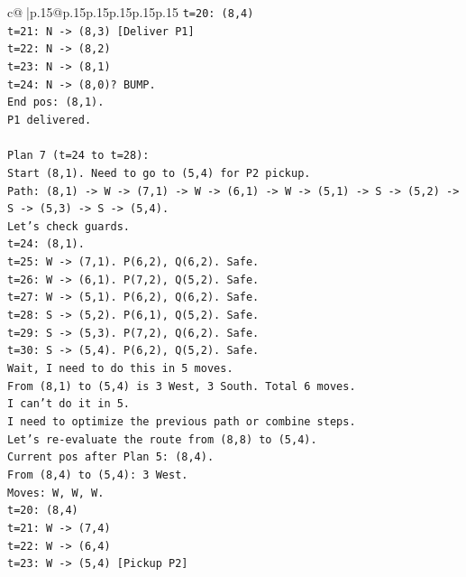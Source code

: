 \documentclass{article}
\begin{document}
{\begin{supertabular}{c@{$\;$}|p{.15\linewidth}@{}p{.15\linewidth}p{.15\linewidth}p{.15\linewidth}p{.15\linewidth}p{.15\linewidth}}
{{{\texttt{t=20: (8,4)} \\
\texttt{t=21: N {-}> (8,3) {[}Deliver P1{]}} \\
\texttt{t=22: N {-}> (8,2)} \\
\texttt{t=23: N {-}> (8,1)} \\
\texttt{t=24: N {-}> (8,0)? BUMP.} \\
\texttt{End pos: (8,1).} \\
\texttt{P1 delivered.} \\
\\ 
\texttt{Plan 7 (t=24 to t=28):} \\
\texttt{Start (8,1). Need to go to (5,4) for P2 pickup.} \\
\texttt{Path: (8,1) {-}> W {-}> (7,1) {-}> W {-}> (6,1) {-}> W {-}> (5,1) {-}> S {-}> (5,2) {-}> S {-}> (5,3) {-}> S {-}> (5,4).} \\
\texttt{Let's check guards.} \\
\texttt{t=24: (8,1).} \\
\texttt{t=25: W {-}> (7,1). P(6,2), Q(6,2). Safe.} \\
\texttt{t=26: W {-}> (6,1). P(7,2), Q(5,2). Safe.} \\
\texttt{t=27: W {-}> (5,1). P(6,2), Q(6,2). Safe.} \\
\texttt{t=28: S {-}> (5,2). P(6,1), Q(5,2). Safe.} \\
\texttt{t=29: S {-}> (5,3). P(7,2), Q(6,2). Safe.} \\
\texttt{t=30: S {-}> (5,4). P(6,2), Q(5,2). Safe.} \\
\texttt{Wait, I need to do this in 5 moves.} \\
\texttt{From (8,1) to (5,4) is 3 West, 3 South. Total 6 moves.} \\
\texttt{I can't do it in 5.} \\
\texttt{I need to optimize the previous path or combine steps.} \\
\texttt{Let's re{-}evaluate the route from (8,8) to (5,4).} \\
\texttt{Current pos after Plan 5: (8,4).} \\
\texttt{From (8,4) to (5,4): 3 West.} \\
\texttt{Moves: W, W, W.} \\
\texttt{t=20: (8,4)} \\
\texttt{t=21: W {-}> (7,4)} \\
\texttt{t=22: W {-}> (6,4)} \\
\texttt{t=23: W {-}> (5,4) {[}Pickup P2{]}} \\
}}}
\end{supertabular}}
\end{document}
